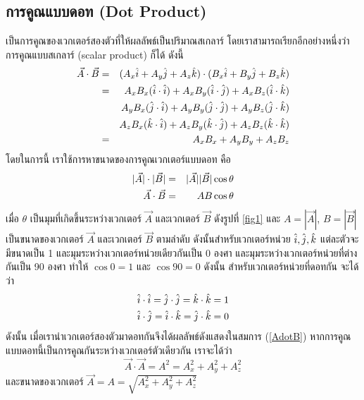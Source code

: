 \subsection{การคูณแบบดอท (Dot Product)}

เป็นการคูณของเวกเตอร์สองตัวที่ให้ผลลัพธ์เป็นปริมาณสเกลาร์ โดยเราสามารถเรียกอีกอย่างหนึ่งว่า การคูณแบบสเกลาร์ (scalar product) ก็ได้ ดังนี้
\begin{eqnarray}\label{AdotB}
\vec{A} \cdot \vec{B} &=& (A_x\hat{i} + A_y\hat{j} + A_z\hat{k})\cdot (B_x\hat{i} + B_y\hat{j} + B_z\hat{k}) \nonumber \\
        &=& A_xB_x(\hat{i}\cdot\hat{i}) + A_xB_y(\hat{i}\cdot\hat{j}) + A_xB_z(\hat{i}\cdot\hat{k}) \nonumber \\
        & & A_yB_x(\hat{j}\cdot\hat{i}) + A_yB_y(\hat{j}\cdot\hat{j}) + A_yB_z(\hat{j}\cdot\hat{k}) \nonumber \\
        & & A_zB_x(\hat{k}\cdot\hat{i}) + A_zB_y(\hat{k}\cdot\hat{j}) + A_zB_z(\hat{k}\cdot\hat{k}) \nonumber \\
        &=& A_xB_x + A_yB_y + A_zB_z
\end{eqnarray}
โดยในการนี้ เราใช้การหาขนาดของการคูณเวกเตอร์แบบดอท คือ
\begin{eqnarray}\label{AdotBangle}
|\vec{A}|\cdot|\vec{B}| &=& |\vec{A}||\vec{B}|\cos \theta \nonumber \\
\vec{A}\cdot\vec{B} &=& AB\cos \theta
\end{eqnarray}
เมื่อ $\theta$ เป็นมุมที่เกิดขึ้นระหว่างเวกเตอร์ $\vec{A}$ และเวกเตอร์ $\vec{B}$ ดังรูปที่ \ref{fig1} และ $A = |\vec{A}|$, $B = |\vec{B}|$ เป็นขนาดของเวกเตอร์ $\vec{A}$ และเวกเตอร์ $\vec{B}$ ตามลำดับ ดังนั้นสำหรับเวกเตอร์หน่วย $\hat{i}, \hat{j}, \hat{k}$ แต่ละตัวจะมีขนาดเป็น 1 และมุมระหว่างเวกเตอร์หน่วยเดียวกันเป็น 0 องศา และมุมระหว่างเวกเตอร์หน่วยที่ต่างกันเป็น 90 องศา ทำให้ $\cos 0 = 1$ และ $\cos 90 = 0$ ดังนั้น สำหรับเวกเตอร์หน่วยที่ดอทกัน จะได้ว่า
\begin{equation}\label{eq:DotUnit}
  \begin{aligned}
    \hat{i}\cdot\hat{i} = \hat{j}\cdot\hat{j} = \hat{k}\cdot\hat{k} &= 1 \\
    \hat{i}\cdot\hat{j} = \hat{i}\cdot\hat{k} = \hat{j}\cdot\hat{k} &= 0
  \end{aligned}
\end{equation}
ดังนั้น เมื่อเรานำเวกเตอร์สองตัวมาดอทกันจึงได้ผลลัพธ์ดังแสดงในสมการ (\ref{AdotB}) หากการคูณแบบดอทนี้เป็นการคูณกันระหว่างเวกเตอร์ตัวเดียวกัน เราจะได้ว่า
\begin{equation}
\vec{A}\cdot\vec{A} = A^2 = A_x^2 + A_y^2 + A_z^2
\end{equation}
และขนาดของเวกเตอร์ $\vec{A} = A = \sqrt{A_x^2 + A_y^2 + A_z^2}$

